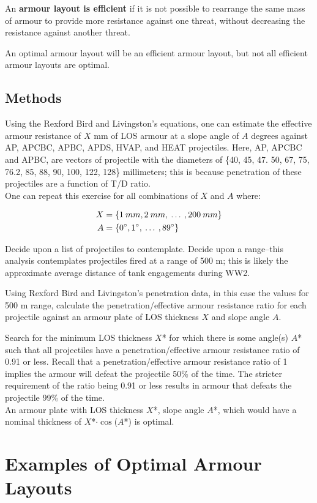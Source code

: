 \documentclass[]{article}
\begin{document}
\noindent An \textbf{armour layout is efficient} if it is not possible to rearrange the same mass of armour to provide more resistance against one threat, without decreasing the resistance against another threat.

An optimal armour layout will be an efficient armour layout, but not all efficient armour layouts are optimal.

\subsection{Methods}
Using the Rexford Bird and Livingston’s equations, one can estimate the effective armour resistance of $X$ mm of LOS armour at a slope angle of $A$ degrees against AP, APCBC, APBC, APDS, HVAP, and HEAT projectiles. Here, AP, APCBC and APBC, are vectors of projectile with the diameters of \{40, 45, 47. 50, 67, 75, 76.2, 85, 88, 90, 100, 122, 128\} millimeters; this is because penetration of these projectiles are a function of T/D ratio.
\\

\noindent One can repeat this exercise for all combinations of $X$ and $A$ where:

\begin{align*}
X &= \{1\:mm, 2\:mm,\: \dots \:, 200\:mm\} \\
A &= \{0\degree, 1\degree,\: \dots \:, 89\degree \}
\end{align*}

\noindent Decide upon a list of projectiles to contemplate. Decide upon a range--this analysis contemplates projectiles fired at a range of 500 m; this is likely the approximate average distance of tank engagements during WW2.

Using Rexford Bird and Livingston’s penetration data, in this case the values for 500 m range, calculate the penetration/effective armour resistance ratio for each projectile against an armour plate of LOS thickness $X$ and slope angle $A$. 

Search for the minimum LOS thickness $X$* for which there is some angle(s) $A$* such that all projectiles have a penetration/effective armour resistance ratio of 0.91 or less. Recall that a penetration/effective armour resistance ratio of 1 implies the armour will defeat the projectile 50\% of the time. The stricter requirement of the ratio being 0.91 or less results in armour that defeats the projectile 99\% of the time.
\\

\noindent An armour plate with LOS thickness $X$*, slope angle $A$*, which would have a nominal thickness of $X$*$\cdot\cos$($A$*) is optimal.

\section{Examples of Optimal Armour Layouts}
\end{document}
